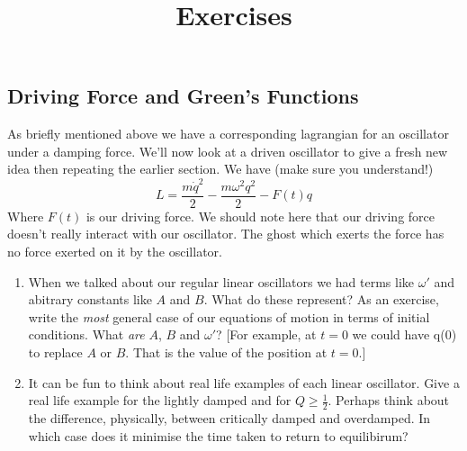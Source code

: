  \subsection{Driving Force and Green's Functions}
As briefly mentioned above we have a corresponding lagrangian for an oscillator under a damping force. We'll now look at a driven oscillator to give a fresh new idea then repeating the earlier section. We have (make sure you understand!)
\begin{equation}
L = \frac{m\dot{q}^{2}}{2} - \frac{m\omega^{2}q^{2}}{2} - F(t)q
\end{equation}
Where $F(t)$ is our driving force. We should note here that our driving force doesn't really interact with our oscillator. The ghost which exerts the force has no force exerted on it by the oscillator.



\title{Exercises}
\begin{enumerate}
\item When we talked about our regular linear oscillators we had terms like $\omega'$ and abitrary constants like $A$ and $B$. What do these represent? As an exercise, write the \textit{most} general case of our equations of motion in terms of initial conditions. What \textit{are} $A$, $B$ and $\omega'$?  [For example, at $t=0$ we could have q(0) to replace $A$ or $B$. That is the value of the position at $t=0$.]
\item It can be fun to think about real life examples of each linear oscillator. Give a real life example for the lightly damped and for $Q \geq \frac {1}{2}$. Perhaps think about the difference, physically, between critically damped and overdamped.  In which case does it minimise the time taken to return to equilibirum? 
\end{enumerate}





